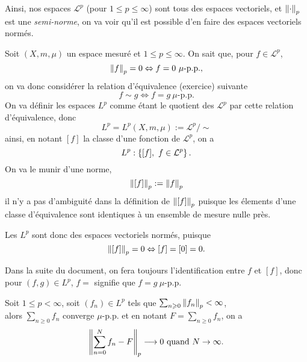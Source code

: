 \documentclass[a4paper,11pt, twoside]{article}
\begin{document}
Ainsi, nos espaces $\mathcal L^p$ (pour $1\leqslant p\leqslant \infty$) sont tous des espaces vectoriels, et $\left\lVert\cdot\right\rVert_p$ est une \emph{semi-norme}, on va voir qu'il est possible d'en faire des espaces vectoriels normés.



Soit $(X,m,\mu)$ un espace mesuré et $1\leqslant p\leqslant \infty$. On sait que, pour $f\in\mathcal L^p$, 
$$\norm{f}_p=0\Leftrightarrow f=0\ \mu\text{-p.p.},$$
on va donc considérer la relation d'équivalence (exercice) suivante
$$f\sim g \Leftrightarrow f=g\ \mu\text{-p.p.}$$
On va définir les espaces $L^p$ comme étant le quotient des $\mathcal L^p$ par cette relation d'équivalence, donc 
$$L^p=L^p(X,m,\mu):=\mathcal L^p/\sim$$
ainsi, en notant $[f]$ la classe d'une fonction de $\mathcal L^p$, on a 
$$L^p:\left\{[f],\ f\in\mathcal L^p\right\}.$$
On va le munir d'une norme, 
$$\left\lVert[f]\right\rVert_p:=\left\lVert f\right\rVert_p$$
il n'y a pas d'ambiguité dans la définition de $\left\lVert[f]\right\rVert_p$ puisque les élements d'une classe d'équivalence sont identiques à un ensemble de mesure nulle près.

Les $L^p$ sont donc des espaces vectoriels normés, puisque 
$$\left\lVert[f]\right\rVert_p=0\Leftrightarrow [f]=[0]=0.$$

Dans la suite du document, on fera toujours l'identification entre $f$ et $[f]$, donc pour $(f,g)\in L^p$, $f=$ signifie que $f=g\ \mu$-p.p.


\begin{Th}
  Soit $1\leqslant p< \infty$, soit $(f_n)\in L^p$ tels que $\sum_{n\geqslant 0}\left\lVert f_n\right\rVert_p<\infty$,\\

  alors $\sum_{n\geqslant 0}f_n$ converge $\mu$-p.p. et en notant $F=\sum_{n\geqslant 0}f_n$, on a 
  $$\left\lVert\sum_{n= 0}^Nf_n-F\right\rVert_p\longrightarrow 0\text{ quand }N\to\infty.$$
\end{Th}
\end{document}
